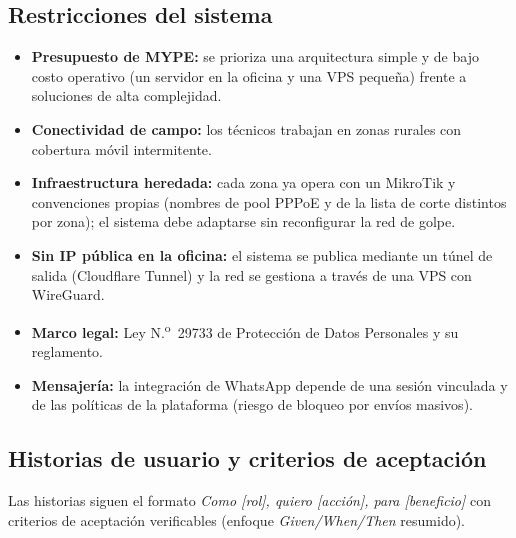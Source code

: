 \subsection{Restricciones del sistema}
\label{sec:ce02-restricciones}

\begin{itemize}
  \item \textbf{Presupuesto de MYPE:} se prioriza una arquitectura simple y de bajo
  costo operativo (un servidor en la oficina y una VPS pequeña) frente a soluciones
  de alta complejidad.
  \item \textbf{Conectividad de campo:} los técnicos trabajan en zonas rurales con
  cobertura móvil intermitente.
  \item \textbf{Infraestructura heredada:} cada zona ya opera con un MikroTik y
  convenciones propias (nombres de pool PPPoE y de la lista de corte distintos por
  zona); el sistema debe adaptarse sin reconfigurar la red de golpe.
  \item \textbf{Sin IP pública en la oficina:} el sistema se publica mediante un túnel
  de salida (Cloudflare Tunnel) y la red se gestiona a través de una VPS con WireGuard.
  \item \textbf{Marco legal:} Ley N.\textsuperscript{o}~29733 de Protección de Datos
  Personales y su reglamento.
  \item \textbf{Mensajería:} la integración de WhatsApp depende de una sesión
  vinculada y de las políticas de la plataforma (riesgo de bloqueo por envíos masivos).
\end{itemize}

\subsection{Historias de usuario y criterios de aceptación}
\label{sec:ce02-hu}

Las historias siguen el formato \emph{Como [rol], quiero [acción], para [beneficio]}
con criterios de aceptación verificables (enfoque \emph{Given/When/Then} resumido).

\newcommand{\historia}[4]{%
\begin{tcolorbox}[enhanced,breakable,colback=white,colframe=upeublue!60,
  boxrule=0.5pt,arc=1pt,left=6pt,right=6pt,top=4pt,bottom=4pt,
  title={\small\textbf{#1} --- #2},coltitle=upeublue,colbacktitle=upeublue!8]
\small #3

\smallskip\textbf{Criterios de aceptación:}
\begin{itemize}[leftmargin=1.2em,itemsep=0pt]
#4
\end{itemize}
\end{tcolorbox}}


